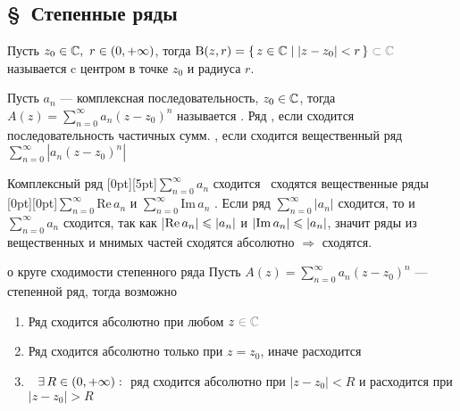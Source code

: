 \subsection*{\S\ Степенные ряды}

\begin{opr}
	Пусть $z_0 \in \mathbb{C},\ r \in (0, +\infty)$, тогда $\B{z, r} = \{\,z \in \cc \mid |z - z_0| < r \,\} \uns{{}\subset \cc}$ называется  c центром в точке $z_0$ и радиуса $r$.
\end{opr}

\begin{opr}
	Пусть $a_n$ --- комплексная последовательность, $z_0 \in \mathbb{C}$, тогда $A(z) = \sum\limits_{n = 0}^{\infty} a_n(z - z_0)^n$ называется  . Ряд , если сходится последовательность частичных сумм. , если сходится вещественный ряд $\sum\limits_{n = 0}^{\infty} |a_n(z - z_0)^n|$
\end{opr}

\begin{zam}
	Комплексный ряд \raisebox{0pt}[0pt][5pt]{$\sum\limits_{n = 0}^{\infty} a_n$} сходится \eq\ сходятся вещественные ряды \raisebox{0pt}[0pt][0pt]{$\sum\limits_{n = 0}^{\infty} \mathrm{Re}\, a_n$} и $\sum\limits_{n = 0}^{\infty} \mathrm{Im}\, a_n$ . 
	Если ряд $\sum\limits_{n = 0}^{\infty} |a_n|$ сходится, то и $\sum\limits_{n = 0}^{\infty} a_n$ сходится, так как |$\mathrm{Re}\, a_n| \leqslant |a_n|$ и $|\mathrm{Im}\, a_n| \leqslant |a_n|$, значит ряды из вещественных и мнимых \medskip частей сходятся абсолютно $\Rightarrow$ сходятся. 
\end{zam}

\begin{teor}[https://youtu.be/zgKkH3Nr6-4?si=MvlhhJxcgF8KG0Mf&t=2204]{о круге сходимости степенного ряда}\label{круг сходимости}
	Пусть $A(z) = \sum\limits_{n = 0}^{\infty} a_n(z - z_0)^n$ --- степенной ряд, тогда возможно
	\begin{enumerate}
		\item Ряд сходится абсолютно при любом $z \uns{{} \in \cc}$
		
		\item Ряд сходится абсолютно только при $z = z_0$, иначе расходится
		
		\item \hspace{-5pt}$\E R \in (0, +\infty) : {}$ ряд сходится абсолютно при $|z - z_0| < R$ и расходится при $|z - z_0| > R$ 
	\end{enumerate}
\end{teor}

